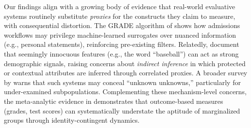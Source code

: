 \documentclass[12pt]{article}
\begin{document}
Our findings align with a growing body of evidence that real-world evaluative systems routinely substitute \emph{proxies} for the constructs they claim to measure, with consequential distortion. The GRADE algorithm of \cite{waters2014grade} shows how admissions workflows may privilege machine-learned surrogates over nuanced information (e.g., personal statements), reinforcing pre-existing filters. Relatedly, \cite{alvero2020ai} document that seemingly innocuous features (e.g., the word ``baseball'') can act as strong demographic signals, raising concerns about \emph{indirect inference} in which protected or contextual attributes are inferred through correlated proxies. A broader survey by \cite{baker2022algorithmic} warns that such systems may conceal ``unknown unknowns,'' particularly for under-examined subpopulations. Complementing these mechanism-level concerns, the meta-analytic evidence in \cite{walton2009latent} demonstrates that outcome-based measures (grades, test scores) can systematically understate the aptitude of marginalized groups through identity-contingent dynamics.
\end{document}
